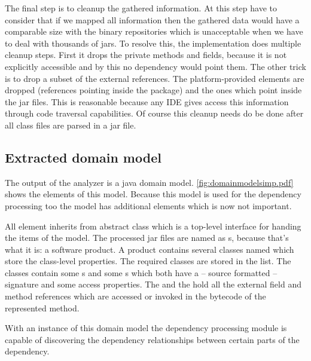 The final step is to cleanup the gathered information. At this step have to
consider that if we mapped all information then the gathered data would have a
comparable size with the binary repositories which is unacceptable when we have
to deal with thousands of jars. To resolve this, the implementation does
multiple cleanup steps. First it drops the private methods and fields, because
it is not explicitly accessible and by this no dependency would point them. The
other trick is to drop a subset of the external references. The
platform-provided elements are dropped (references pointing inside the
 package) and the ones which point inside the jar files. This is
reasonable because any IDE gives access this information through code traversal
capabilities. Of course this cleanup needs do be done after all class files are 
parsed in a jar file. 


\subsection{Extracted domain model}
The output of the analyzer is a java domain model.
\autoref{fig:domainmodelsimp.pdf} shows the elements of this model. Because this
model is used for the dependency processing too the model has additional
elements which is now not important.

All element inherits from abstract  class which is a top-level
interface for handing the items of the model. The processed jar files are named
as s, because that's what it is: a software product. A product
contains several classes named  which store the class-level
properties. The required classes are stored in the 
list. The classes contain some s and some s which both
have a -- source formatted -- signature and some access properties. The
 and the  hold all the external
field and method references which are accessed or invoked in the bytecode of the
represented method.

With an instance of this domain model the dependency processing module is
capable of discovering the dependency relationships between certain parts of the
dependency.
 

